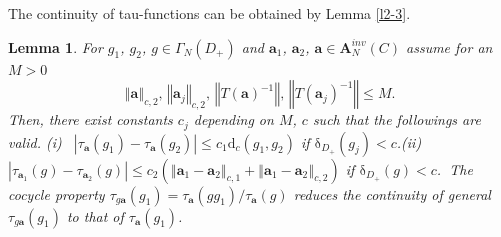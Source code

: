 \documentclass[a4paper]{article}%
\newtheorem{lemma}{Lemma}
\begin{document}
The continuity of tau-functions can be obtained by Lemma \ref{l2-3}.

\begin{lemma}
\label{l2-6}For $g_{1}$, $g_{2}$, $g\in\Gamma_{N}\left(  D_{+}\right)  $ and
$\boldsymbol{a}_{1}$, $\boldsymbol{a}_{2}$, $\boldsymbol{a}\in\boldsymbol{A}%
_{N}^{inv}\left(  C\right)  $ assume for an $M>0$
\[
\left\Vert \boldsymbol{a}\right\Vert _{c,2}\text{, }\left\Vert \boldsymbol{a}%
_{j}\right\Vert _{c,2}\text{, }\left\Vert T\left(  \boldsymbol{a}\right)
^{-1}\right\Vert \text{, }\left\Vert T\left(  \boldsymbol{a}_{j}\right)
^{-1}\right\Vert \leq M\text{.}%
\]
Then, there exist constants $c_{j}$ depending on $M$, $c$ such that the
followings are valid. \newline(i) \ $\left\vert \tau_{\boldsymbol{a}}\left(
g_{1}\right)  -\tau_{\boldsymbol{a}}\left(  g_{2}\right)  \right\vert \leq
c_{1}\mathrm{d}_{c}\left(  g_{1},g_{2}\right)  $ if $\mathrm{\delta}_{D_{+}%
}\left(  g_{j}\right)  <c$.\newline(ii) $\left\vert \tau_{\boldsymbol{a}_{1}%
}\left(  g\right)  -\tau_{\boldsymbol{a}_{2}}\left(  g\right)  \right\vert
\leq c_{2}\left(  \left\Vert \boldsymbol{a}_{1}-\boldsymbol{a}_{2}\right\Vert
_{c,1}+\left\Vert \boldsymbol{a}_{1}-\boldsymbol{a}_{2}\right\Vert
_{c,2}\right)  $ if $\mathrm{\delta}_{D_{+}}\left(  g\right)  <c$.
$\ $\newline The cocycle property $\tau_{g\boldsymbol{a}}\left(  g_{1}\right)
=\tau_{\boldsymbol{a}}\left(  gg_{1}\right)  /\tau_{\boldsymbol{a}}\left(
g\right)  $ reduces the continuity of general $\tau_{g\boldsymbol{a}}\left(
g_{1}\right)  $ to that of $\tau_{\boldsymbol{a}}\left(  g_{1}\right)  $.
\end{lemma}
\end{document}
